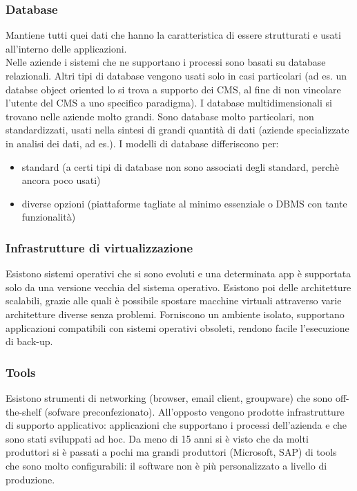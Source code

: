 \subsubsection{Database}
\label{subs:Database}
Mantiene tutti quei dati che hanno la caratteristica di essere strutturati e usati all'interno delle applicazioni.\\
Nelle aziende i sistemi che ne supportano i processi sono basati su database relazionali.
Altri tipi di database vengono usati solo in casi particolari (ad es. un databse object oriented lo si trova a supporto dei CMS, al fine di non vincolare l'utente del CMS a uno specifico paradigma).
I database multidimensionali si trovano nelle aziende molto grandi. Sono database molto particolari, non standardizzati, usati nella sintesi di grandi quantit\`a di dati (aziende specializzate in analisi dei dati, ad es.).
I modelli di database differiscono per:
\begin{itemize}
  \item standard (a certi tipi di  database non sono associati degli standard, perch\`e ancora poco usati)
  \item diverse opzioni (piattaforme tagliate al minimo essenziale o DBMS con tante funzionalit\`a)
\end{itemize}
\subsubsection{Infrastrutture di virtualizzazione}
\label{subs:Infrastrutture di virtualizzazione}
Esistono sistemi operativi che si sono evoluti e una determinata app \`e supportata solo da una versione vecchia del sistema operativo.
Esistono poi delle architetture scalabili, grazie alle quali \`e possibile spostare macchine virtuali attraverso varie architetture diverse senza problemi.
Forniscono un ambiente isolato, supportano applicazioni compatibili con sistemi operativi obsoleti, rendono facile l'esecuzione di back-up.



\subsubsection{Tools}
\label{subs:Tools}
Esistono strumenti di networking (browser, email client, groupware) che sono off-the-shelf (sofware preconfezionato).
All'opposto vengono prodotte infrastrutture di supporto applicativo: applicazioni che supportano i processi dell'azienda e che sono stati sviluppati ad hoc.
Da meno di 15 anni si \`e visto che da molti produttori si \`e passati a pochi ma grandi produttori
(Microsoft, SAP) di tools che sono molto configurabili: il software non \`e pi\`u personalizzato
a livello di produzione.

